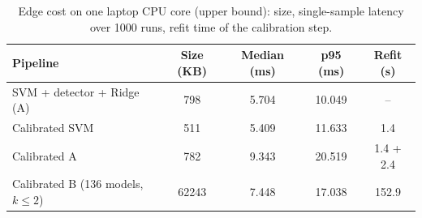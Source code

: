 \begin{table}[t]
\centering
\footnotesize
\caption{Edge cost on one laptop CPU core (upper bound): size, single-sample latency over 1000 runs, refit time of the calibration step.}
\label{tab:edge}
\setlength{\tabcolsep}{3pt}
\begin{tabular}{lcccc}
\toprule
Pipeline & Size (KB) & Median (ms) & p95 (ms) & Refit (s) \\
\midrule
SVM + detector + Ridge (A) & 798 & 5.704 & 10.049 & -- \\
Calibrated SVM & 511 & 5.409 & 11.633 & 1.4 \\
Calibrated A & 782 & 9.343 & 20.519 & 1.4 + 2.4 \\
Calibrated B (136 models, $k\le2$) & 62243 & 7.448 & 17.038 & 152.9 \\
\bottomrule
\end{tabular}
\end{table}

